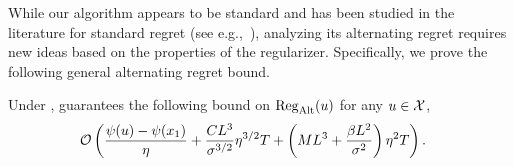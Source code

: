 While our algorithm appears to be standard and has been studied in the literature for standard regret (see e.g.,~\citet{orabona2019modern}),
analyzing its alternating regret requires new ideas based on the properties of the regularizer.
Specifically, we prove the following general alternating regret bound.
\begin{theorem}\label{thm: OCO}
    Under ,  guarantees the following bound on $\mathrm{Reg}_{\mathrm{Alt}}(u)$ for any $u\in{\mathcal{X}}$,
    \begin{equation}\label{eqn:OCO}
        \begin{aligned}
        &\mathcal{O}\left(\frac{\psi(u)-\psi(x_1)}{\eta}+ \frac{CL^3}{\sigma^{3/2}}\eta^{3/2}T+\left(ML^3+\frac{\beta L^2}{\sigma^2}\right)\eta^2T\right).
        \end{aligned}
    \end{equation}
\end{theorem}

